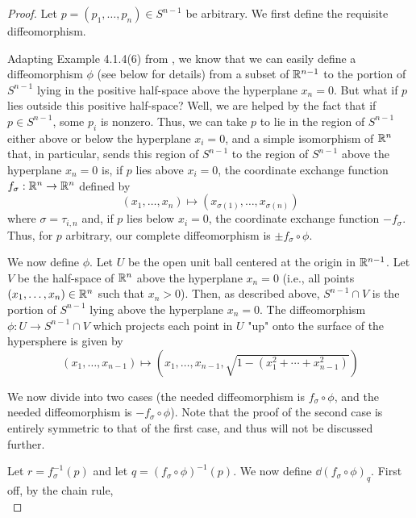 \documentclass[../psets.tex]{subfiles}
\begin{document}
\begin{enumerate}[label={\textbf{4.2.\roman*.}}]
\begin{proof}
        Let $p=(p_1,\dots,p_n)\in S^{n-1}$ be arbitrary. We first define the requisite diffeomorphism.\par\medskip
        Adapting Example 4.1.4(6) from \textcite[98]{bib:DifferentialForms}, we know that we can easily define a diffeomorphism $\phi$ (see below for details) from a subset of $\mathbb{R}^{n-1}$ to the portion of $S^{n-1}$ lying in the positive half-space above the hyperplane $x_n=0$. But what if $p$ lies outside this positive half-space? Well, we are helped by the fact that if $p\in S^{n-1}$, some $p_i$ is nonzero. Thus, we can take $p$ to lie in the region of $S^{n-1}$ either above or below the hyperplane $x_i=0$, and a simple isomorphism of $\mathbb{R}^n$ that, in particular, sends this region of $S^{n-1}$ to the region of $S^{n-1}$ above the hyperplane $x_n=0$ is, if $p$ lies above $x_i=0$, the coordinate exchange function $f_\sigma:\mathbb{R}^n\to\mathbb{R}^n$ defined by
        \begin{equation*}
            (x_1,\dots,x_n) \mapsto (x_{\sigma(1)},\dots,x_{\sigma(n)})
        \end{equation*}
        where $\sigma=\tau_{i,n}$ and, if $p$ lies below $x_i=0$, the coordinate exchange function $-f_\sigma$. Thus, for $p$ arbitrary, our complete diffeomorphism is $\pm f_\sigma\circ\phi$.\par
        We now define $\phi$. Let $U$ be the open unit ball centered at the origin in $\mathbb{R}^{n-1}$. Let $V$ be the half-space of $\mathbb{R}^n$ above the hyperplane $x_n=0$ (i.e., all points $(x_1,\dots,x_n)\in\mathbb{R}^n$ such that $x_n>0$). Then, as described above, $S^{n-1}\cap V$ is the portion of $S^{n-1}$ lying above the hyperplane $x_n=0$. The diffeomorphism $\phi:U\to S^{n-1}\cap V$ which projects each point in $U$ "up" onto the surface of the hypersphere is given by
        \begin{equation*}
            (x_1,\dots,x_{n-1}) \mapsto \left( x_1,\dots,x_{n-1},\sqrt{1-\left( x_1^2+\cdots+x_{n-1}^2 \right)} \right)
        \end{equation*}\par\medskip
        We now divide into two cases (the needed diffeomorphism is $f_\sigma\circ\phi$, and the needed diffeomorphism is $-f_\sigma\circ\phi$). Note that the proof of the second case is entirely symmetric to that of the first case, and thus will not be discussed further.\par\smallskip
        Let $r=f_\sigma^{-1}(p)$ and let $q=(f_\sigma\circ\phi)^{-1}(p)$. We now define $\dd(f_\sigma\circ\phi)_q$. First off, by the chain rule,
        \begin{equation*}

\end{equation*}
\end{proof}
\end{enumerate}
\end{document}
